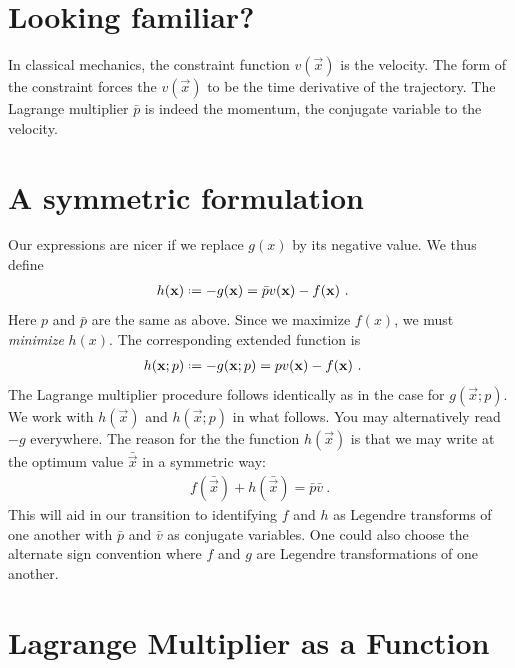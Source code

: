 \section{Looking familiar?}

In classical mechanics, the constraint function $v(\vec{x})$ is the velocity. The form of the constraint forces the $v(\vec{x})$ to be the time derivative of the trajectory. The Lagrange multiplier $\bar p$ is indeed the momentum, the conjugate variable to the velocity. 

\section{A symmetric formulation}

Our expressions are nicer if we replace $g(x)$ by its negative value. We thus define
\begin{align}
    h(\vec{x}) &\defeq - g(\vec{x}) = \bar p v(\vec{x}) - f(\vec{x}) \ .
\end{align}
Here $p$ and $\bar p$ are the same as above. Since we maximize $f(x)$, we must \emph{minimize} $h(x)$. The corresponding extended function is
\begin{align}
    h(\vec{x}; p) &\defeq - g(\vec{x};p) = p v(\vec{x}) - f(\vec{x}) \ .
    \label{eq:h:x:p}
\end{align}
The Lagrange multiplier procedure follows identically as in the case for $g(\vec{x};p)$. We work with $h(\vec{x})$ and $h(\vec{x};p)$ in what follows. You may alternatively read $-g$ everywhere. The reason for the the function $h(\vec{x})$ is that we may write at the optimum value $\bar{\vec{x}}$ in a symmetric way:
\begin{align}
    f(\bar{\vec{x}}) + h(\bar{\vec{x}}) = \bar p \bar v \ .
    \label{eq:pre:Legendre:f:h:p:v}
\end{align}
This will aid in our transition to identifying $f$ and $h$ as Legendre transforms of one another with $\bar p$ and $\bar v$ as conjugate variables. One could also choose the alternate sign convention where $f$ and $g$ are Legendre transformations of one another.





\section{Lagrange Multiplier as a Function}

